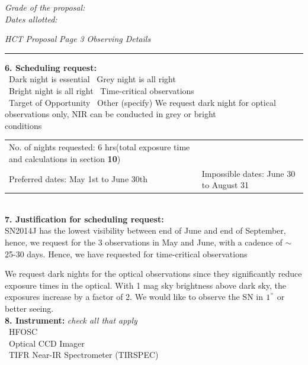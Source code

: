 \documentclass[11pt]{article}
\begin{document}
{\it Grade of the proposal:} \hfil \\

{\it Dates allotted:}

\newpage
{\it HCT Proposal}\hskip 5cm {\it Page 3} \hfill {\it Observing Details}\\[1mm]
\hrule
{\bf 6. Scheduling request: }~~~~~\\
%

\NO~Dark night is essential \hfil \NO~Grey night is all right~~~~~\\
\NO~Bright night is all right \hfil \YES~Time-critical observations\\
\NO~Target of Opportunity \hfil \YES~Other (specify)  We request dark night for optical observations only, NIR can be conducted in grey or bright conditions~~~~~~~~~~~~~\\

\begin{tabular}[t]{p{9cm}p{9cm}}
{No. of nights requested: 6 hrs}(total exposure time and calculations in section \textbf{10})\\
{Preferred dates: May 1st to June 30th} & {Impossible dates: June 30 to August 31}\\

\end{tabular} \\ 

{\bf 7. Justification for scheduling request: }\\
SN2014J has the lowest visibility between end of June and end of September, hence, we request for the 3 observations in May and June,  with a cadence of $\sim$ 25-30 days. Hence, we have requested for time-critical observations

We request dark nights for the optical observations since they significantly reduce exposure times in the optical. With 1 mag  sky brightness above dark sky, the exposures increase by a factor of 2. We would like to observe the SN in $1^{"}$ or better seeing. 
\\

{\bf 8. Instrument:} {\sl check all that apply}\\
%
\YES~HFOSC\\
\NO~Optical CCD Imager\\
\YES~TIFR Near-IR Spectrometer (TIRSPEC)\\
\end{document}
